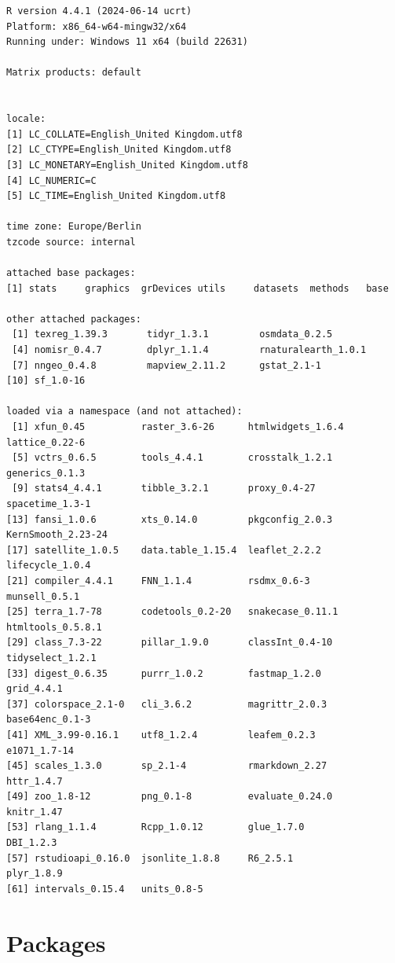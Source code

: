\documentclass[
  letterpaper,
]{scrbook}
\begin{document}
\begin{verbatim}
R version 4.4.1 (2024-06-14 ucrt)
Platform: x86_64-w64-mingw32/x64
Running under: Windows 11 x64 (build 22631)

Matrix products: default


locale:
[1] LC_COLLATE=English_United Kingdom.utf8 
[2] LC_CTYPE=English_United Kingdom.utf8   
[3] LC_MONETARY=English_United Kingdom.utf8
[4] LC_NUMERIC=C                           
[5] LC_TIME=English_United Kingdom.utf8    

time zone: Europe/Berlin
tzcode source: internal

attached base packages:
[1] stats     graphics  grDevices utils     datasets  methods   base     

other attached packages:
 [1] texreg_1.39.3       tidyr_1.3.1         osmdata_0.2.5      
 [4] nomisr_0.4.7        dplyr_1.1.4         rnaturalearth_1.0.1
 [7] nngeo_0.4.8         mapview_2.11.2      gstat_2.1-1        
[10] sf_1.0-16          

loaded via a namespace (and not attached):
 [1] xfun_0.45          raster_3.6-26      htmlwidgets_1.6.4  lattice_0.22-6    
 [5] vctrs_0.6.5        tools_4.4.1        crosstalk_1.2.1    generics_0.1.3    
 [9] stats4_4.4.1       tibble_3.2.1       proxy_0.4-27       spacetime_1.3-1   
[13] fansi_1.0.6        xts_0.14.0         pkgconfig_2.0.3    KernSmooth_2.23-24
[17] satellite_1.0.5    data.table_1.15.4  leaflet_2.2.2      lifecycle_1.0.4   
[21] compiler_4.4.1     FNN_1.1.4          rsdmx_0.6-3        munsell_0.5.1     
[25] terra_1.7-78       codetools_0.2-20   snakecase_0.11.1   htmltools_0.5.8.1 
[29] class_7.3-22       pillar_1.9.0       classInt_0.4-10    tidyselect_1.2.1  
[33] digest_0.6.35      purrr_1.0.2        fastmap_1.2.0      grid_4.4.1        
[37] colorspace_2.1-0   cli_3.6.2          magrittr_2.0.3     base64enc_0.1-3   
[41] XML_3.99-0.16.1    utf8_1.2.4         leafem_0.2.3       e1071_1.7-14      
[45] scales_1.3.0       sp_2.1-4           rmarkdown_2.27     httr_1.4.7        
[49] zoo_1.8-12         png_0.1-8          evaluate_0.24.0    knitr_1.47        
[53] rlang_1.1.4        Rcpp_1.0.12        glue_1.7.0         DBI_1.2.3         
[57] rstudioapi_0.16.0  jsonlite_1.8.8     R6_2.5.1           plyr_1.8.9        
[61] intervals_0.15.4   units_0.8-5       
\end{verbatim}

\hypertarget{packages}{%
\section{Packages}\label{packages}}
\end{document}
